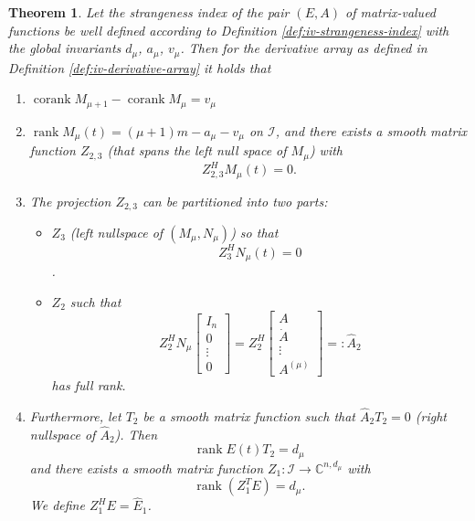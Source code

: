 \documentclass[]{book}
\providecommand{\tightlist}{%
  \setlength{\itemsep}{0pt}\setlength{\parskip}{0pt}}
\newtheorem{theorem}{Theorem}[chapter]
\theoremstyle{definition}
\theoremstyle{definition}
\theoremstyle{definition}
\theoremstyle{definition}
\theoremstyle{remark}
\begin{document}
\begin{theorem}
\protect\hypertarget{thm:iv-derivative-arrays-projections}{}{\label{thm:iv-derivative-arrays-projections} }Let the strangeness index of the pair \((E, A)\) of matrix-valued functions be well defined according to Definition \ref{def:iv-strangeness-index} with the global invariants \(d_\mu\), \(a_\mu\), \(v_\mu\). Then for the derivative array as defined in Definition \ref{def:iv-derivative-array} it holds that

\begin{enumerate}
\def\labelenumi{\arabic{enumi}.}
\item
  \(\operatorname{corank}M_{\mu+1}- \operatorname{corank}M_\mu = v_\mu\)
\item
  \(\operatorname{rank}M_\mu(t) = (\mu+1)m-a_\mu - v_\mu\) on \(\mathcal I\), and there exists a smooth matrix function \(Z_{2,3}\) (that spans the left null space of \(M_\mu\)) with
  \[
   Z_{2,3}^H M_\mu(t) =0.
  \]
\item
  The projection \(Z_{2,3}\) can be partitioned into two parts:

  \begin{itemize}
  \tightlist
  \item
    \(Z_3\) (left nullspace of \((M_\mu, N_\mu)\)) so that \[Z_3^HN_\mu(t) =0\].
  \item
    \(Z_2\) such that
    \[
    Z_2^HN_\mu 
    \begin{bmatrix}
    I_n \\ 0 \\ \vdots \\ 0 
    \end{bmatrix}
    =
    Z_2^H
    \begin{bmatrix}
    A \\ \dot A \\ \vdots \\ A^{(\mu)}
    \end{bmatrix}
     =:\hat A_2
    \]
    has full rank.
  \end{itemize}
\item
  Furthermore, let \(T_2\) be a smooth matrix function such that \(\hat A_2 T_2=0\) (right nullspace of \(\hat A_2\)). Then
  \[
  \operatorname{rank}E(t) T_2 = d_\mu
  \]
  and there exists a smooth matrix function \(Z_1\colon \mathcal I \to \mathbb C^{n,d_\mu}\) with \[\operatorname{rank}(Z_1^TE) = d_\mu.\]
  We define \(Z_1^HE=\hat E_1\).
\end{enumerate}
\end{theorem}
\end{document}
